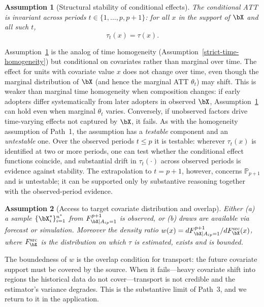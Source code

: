 \documentclass{article}
\newtheorem{assumption}{Assumption}
\renewcommand{\P}{\mathbb{P}}
\begin{document}
\begin{assumption}[Structural stability of conditional effects]\label{assump:struct-stab}
The conditional ATT is invariant across periods $t \in \{1,\ldots,p,p+1\}$: for all $x$ in the support of $\bX$ and all such $t$,
\[
\tau_t(x) = \tau(x).
\]
\end{assumption}

Assumption~\ref{assump:struct-stab} is the analog of time homogeneity (Assumption~\ref{strict-time-homogeneity}) but conditional on covariates rather than marginal over time. The effect for units with covariate value $x$ does not change over time, even though the marginal distribution of $\bX$ (and hence the marginal ATT $\theta_t$) may shift. This is weaker than marginal time homogeneity when composition changes: if early adopters differ systematically from later adopters in observed $\bX$, Assumption~\ref{assump:struct-stab} can hold even when marginal $\theta_t$ varies. Conversely, if unobserved factors drive time-varying effects not captured by $\bX$, it fails. As with the homogeneity assumption of Path~1, the assumption has a \emph{testable} component and an \emph{untestable} one. Over the observed periods $t \leq p$ it is testable: wherever $\tau_t(x)$ is identified at two or more periods, one can test whether the conditional effect functions coincide, and substantial drift in $\tau_t(\cdot)$ across observed periods is evidence against stability. The extrapolation to $t = p+1$, however, concerns $\P_{p+1}$ and is untestable; it can be supported only by substantive reasoning together with the observed-period evidence.

\begin{assumption}[Access to target covariate distribution and overlap]\label{assump:target-dist}
Either (a) a sample $\{\bX_i^*\}_{i=1}^{n^*}$ from $F_{\bX | A_{ip}=1}^{p+1}$ is observed, or (b) draws are available via forecast or simulation. Moreover the density ratio $w(x) = dF_{\bX | A_{ip}=1}^{p+1} / dF_{\bX}^{\mathrm{src}}(x)$, where $F_{\bX}^{\mathrm{src}}$ is the distribution on which $\tau$ is estimated, exists and is bounded.
\end{assumption}

The boundedness of $w$ is the overlap condition for transport: the future covariate support must be covered by the source. When it fails---heavy covariate shift into regions the historical data do not cover---transport is not credible and the estimator's variance degrades. This is the substantive limit of Path~3, and we return to it in the application.
\end{document}

